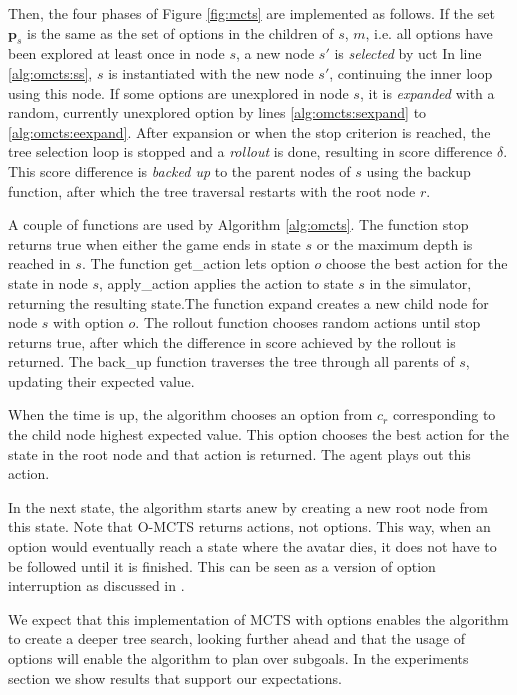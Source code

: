 Then, the four phases of Figure \ref{fig:mcts} are implemented as follows.  If
the set $\mathbf{p}_s$ is the same as the set of options in the children of $s$,
$m$, i.e. all options have been explored at least once in node $s$, a new node
$s'$ is \emph{selected} by \textsf{uct} In line \ref{alg:omcts:ss}, $s$ is
instantiated with the new node $s'$, continuing the inner loop using this node.
If some options are unexplored in node $s$, it is \emph{expanded} with a random,
currently unexplored option by lines \ref{alg:omcts:sexpand} to
\ref{alg:omcts:eexpand}. After expansion or when the stop criterion is reached,
the tree selection loop is stopped and a \emph{rollout} is done, resulting in
score difference $\delta$. This score difference is \emph{backed up} to the
parent nodes of $s$ using the backup function, after which the tree traversal
restarts with the root node $r$.

A couple of functions are used by Algorithm \ref{alg:omcts}. The function
\textsf{stop} returns true when either the game ends in state $s$ or the maximum
depth is reached in $s$. The function \textsf{get\_action} lets option $o$
choose the best action for the state in node $s$, \textsf{apply\_action} applies
the action to state $s$ in the simulator, returning the resulting state.The
function \textsf{expand} creates a new child node for node $s$ with option $o$.
The \textsf{rollout} function chooses random actions until \textsf{stop} returns
true, after which the difference in score achieved by the rollout is returned.
The \textsf{back\_up} function traverses the tree through all parents of $s$,
updating their expected value.

When the time is up, the algorithm chooses an option from $c_r$ corresponding to
the child node highest expected value. This option chooses the best
action for the state in the root node and that action is returned. The agent
plays out this action. 

In the next state, the algorithm starts anew by creating a new root node from
this state. Note that O-MCTS returns actions, not options. This way, when an
option would eventually reach a state where the avatar dies, it does not have to
be followed until it is finished. This can be seen as a version of option
interruption as discussed in \cite{sutton1999between}.

We expect that this implementation of MCTS with options enables the algorithm to
create a deeper tree search, looking further ahead and that the usage of options
will enable the algorithm to plan over subgoals. In the experiments section we
show results that support our expectations.
